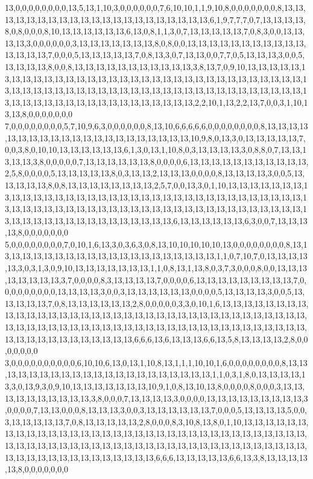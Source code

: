 13,0,0,0,0,0,0,0,0,13,5,13,1,10,3,0,0,0,0,0,0,7,6,10,10,1,1,9,10,8,0,0,0,0,0,0,0,8,13,13,13,13,13,13,13,13,13,13,13,13,13,13,13,13,13,13,13,13,13,6,1,9,7,7,7,0,7,13,13,13,13,8,0,8,0,0,0,8,10,13,13,13,13,13,13,6,13,0,8,1,1,3,0,7,13,13,13,13,13,7,0,8,3,0,0,13,13,13,13,3,0,0,0,0,0,0,3,13,13,13,13,13,13,13,8,0,8,0,0,13,13,13,13,13,13,13,13,13,13,13,13,13,13,13,7,0,0,0,5,13,13,13,13,13,7,0,8,13,3,0,7,13,13,0,0,7,7,0,5,13,13,13,3,0,0,5,13,13,13,13,8,0,0,8,13,13,13,13,13,13,13,13,13,13,13,3,8,13,7,0,9,10,13,13,13,13,13,13,13,13,13,13,13,13,13,13,13,13,13,13,13,13,13,13,13,13,13,13,13,13,13,13,13,13,13,13,13,13,13,13,13,13,13,13,13,13,13,13,13,13,13,13,13,13,13,13,13,13,13,13,13,13,13,13,13,13,13,13,13,13,13,13,13,13,13,13,13,13,13,13,13,2,2,10,1,13,2,2,13,7,0,0,3,1,10,13,13,8,0,0,0,0,0,0,0
7,0,0,0,0,0,0,0,0,5,7,10,9,6,3,0,0,0,0,0,0,8,13,10,6,6,6,6,6,0,0,0,0,0,0,0,0,8,13,13,13,13,13,13,13,13,13,13,13,13,13,13,13,13,13,13,13,13,13,10,9,8,0,13,3,0,13,13,13,13,13,7,0,0,3,8,0,10,10,13,13,13,13,13,13,6,1,3,0,13,1,10,8,0,3,13,13,13,13,3,0,8,8,0,7,13,13,13,13,13,3,8,0,0,0,0,0,7,13,13,13,13,13,13,8,0,0,0,0,6,13,13,13,13,13,13,13,13,13,13,13,2,5,8,0,0,0,0,5,13,13,13,13,13,8,0,3,13,13,2,13,13,13,0,0,0,0,8,13,13,13,13,3,0,0,5,13,13,13,13,13,8,0,8,13,13,13,13,13,13,13,13,2,5,7,0,0,13,3,0,1,10,13,13,13,13,13,13,13,13,13,13,13,13,13,13,13,13,13,13,13,13,13,13,13,13,13,13,13,13,13,13,13,13,13,13,13,13,13,13,13,13,13,13,13,13,13,13,13,13,13,13,13,13,13,13,13,13,13,13,13,13,13,13,13,13,13,13,13,13,13,13,13,13,13,13,13,13,13,13,13,6,13,13,13,13,13,13,6,3,0,0,7,13,13,13,13,8,0,0,0,0,0,0,0
5,0,0,0,0,0,0,0,0,7,0,10,1,6,13,3,0,3,6,3,0,8,13,10,10,10,10,10,13,0,0,0,0,0,0,0,0,8,13,13,13,13,13,13,13,13,13,13,13,13,13,13,13,13,13,13,13,13,13,1,1,0,7,10,7,0,13,13,13,13,13,3,0,3,1,3,0,9,10,13,13,13,13,13,13,13,1,1,0,8,13,1,13,8,0,3,7,3,0,0,0,8,0,0,13,13,13,13,13,13,13,13,3,7,0,0,0,0,8,3,13,13,13,13,7,0,0,0,0,6,13,13,13,13,13,13,13,13,13,7,0,0,0,0,0,0,0,0,0,13,13,13,13,3,0,0,3,13,13,13,13,13,13,0,0,0,0,5,13,13,13,13,3,0,0,5,13,13,13,13,13,7,0,8,13,13,13,13,13,13,2,8,0,0,0,0,0,3,3,0,10,1,6,13,13,13,13,13,13,13,13,13,13,13,13,13,13,13,13,13,13,13,13,13,13,13,13,13,13,13,13,13,13,13,13,13,13,13,13,13,13,13,13,13,13,13,13,13,13,13,13,13,13,13,13,13,13,13,13,13,13,13,13,13,13,13,13,13,13,13,13,13,13,13,13,13,13,13,13,6,6,6,13,6,13,13,13,6,6,13,5,8,13,13,13,13,2,8,0,0,0,0,0,0,0
3,0,0,0,0,0,0,0,0,0,0,6,10,10,6,13,0,13,1,10,8,13,1,1,1,10,10,1,6,0,0,0,0,0,0,0,0,8,13,13,13,13,13,13,13,13,13,13,13,13,13,13,13,13,13,13,13,13,13,1,1,0,3,1,8,0,13,13,13,13,13,3,0,13,9,3,0,9,10,13,13,13,13,13,13,13,10,9,1,0,8,13,10,13,8,0,0,0,0,8,0,0,0,3,13,13,13,13,13,13,13,13,13,13,3,8,0,0,0,7,13,13,13,13,3,0,0,0,0,13,13,13,13,13,13,13,13,13,3,0,0,0,0,7,13,13,0,0,0,8,13,13,13,3,0,0,3,13,13,13,13,13,13,7,0,0,0,5,13,13,13,13,5,0,0,3,13,13,13,13,13,7,0,8,13,13,13,13,13,2,8,0,0,0,8,3,10,8,13,8,0,1,10,13,13,13,13,13,13,13,13,13,13,13,13,13,13,13,13,13,13,13,13,13,13,13,13,13,13,13,13,13,13,13,13,13,13,13,13,13,13,13,13,13,13,13,13,13,13,13,13,13,13,13,13,13,13,13,13,13,13,13,13,13,13,13,13,13,13,13,13,13,13,13,13,13,13,13,13,6,6,6,13,13,13,13,13,6,6,13,3,8,13,13,13,13,13,8,0,0,0,0,0,0,0
